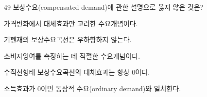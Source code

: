 \begin{question}{49}
보상수요(compensated demand)에 관한 설명으로 옳지 않은 것은?
\begin{choices}
  \item 가격변화에서 대체효과만 고려한 수요개념이다.
  \item 기펜재의 보상수요곡선은 우하향하지 않는다.
  \item 소비자잉여를 측정하는 데 적절한 수요개념이다.
  \item 수직선형태 보상수요곡선의 대체효과는 항상 0이다.
  \item 소득효과가 0이면 통상적 수요(ordinary demand)와 일치한다.
\end{choices}
\end{question}

